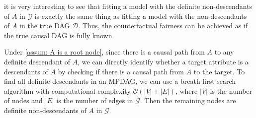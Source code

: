 \documentclass{article}
\begin{document}
it is very interesting to see that fitting a model with the definite non-descendants of $A$ in $\mathcal{G}$ is exactly the same thing as fitting a model with the non-descendants of $A$ in the true DAG $\mathcal{D}$. Thus, the counterfactual fairness can be achieved as if the true causal DAG is fully known. 

Under \cref{assum: A is a root node}, since there is a causal path from $A$ to any definite descendant of $A$, we can directly identify whether a target attribute is a descendants of $A$ by checking if there is a causal path from $A$ to the target. To find all definite descendants in an MPDAG, we can use a breath first search algorithm with computational complexity $\mathcal{O}(|V|+|E|)$, where $|V|$ is the number of nodes and $|E|$ is the number of edges in $\mathcal{G}$. Then the remaining nodes are definite non-descendants of $A$ in $\mathcal{G}$.



\end{document}

